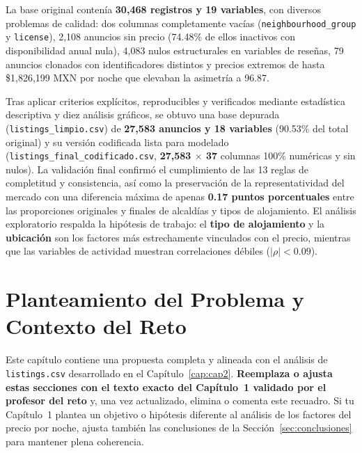 \documentclass[12pt,letterpaper,oneside]{report}
\begin{document}
La base original contenía \textbf{30,468 registros y 19 variables}, con diversos problemas de calidad: dos columnas completamente vacías (\texttt{neighbourhood\_group} y \texttt{license}), 2,108 anuncios sin precio (74.48\% de ellos inactivos con disponibilidad anual nula), 4,083 nulos estructurales en variables de reseñas, 79 anuncios clonados con identificadores distintos y precios extremos de hasta \$1,826,199 MXN por noche que elevaban la asimetría a 96.87.

Tras aplicar criterios explícitos, reproducibles y verificados mediante estadística descriptiva y diez análisis gráficos, se obtuvo una base depurada (\texttt{listings\_limpio.csv}) de \textbf{27,583 anuncios y 18 variables} (90.53\% del total original) y su versión codificada lista para modelado (\texttt{listings\_final\_codificado.csv}, \textbf{27,583 $\times$ 37} columnas 100\% numéricas y sin nulos). La validación final confirmó el cumplimiento de las 13 reglas de completitud y consistencia, así como la preservación de la representatividad del mercado con una diferencia máxima de apenas \textbf{0.17 puntos porcentuales} entre las proporciones originales y finales de alcaldías y tipos de alojamiento. El análisis exploratorio respalda la hipótesis de trabajo: el \textbf{tipo de alojamiento} y la \textbf{ubicación} son los factores más estrechamente vinculados con el precio, mientras que las variables de actividad muestran correlaciones débiles ($|\rho| < 0.09$).

\tableofcontents
\listoffigures
\listoftables

\clearpage
{}

\chapter{Planteamiento del Problema y Contexto del Reto}
\label{cap:cap1}

\begin{tcolorbox}[
  colback=WarnBg,
  colframe=WarnBorder,
  title={\textbf{Nota para el equipo -- Sustituir con el Capítulo 1 validado por el profesor}},
  fonttitle=\bfseries\small,
  arc=2pt,
  boxrule=0.8pt
]
\small
Este capítulo contiene una propuesta completa y alineada con el análisis de \texttt{listings.csv} desarrollado en el Capítulo~\ref{cap:cap2}. \textbf{Reemplaza o ajusta estas secciones con el texto exacto del Capítulo~1 validado por el profesor del reto} y, una vez actualizado, elimina o comenta este recuadro. Si tu Capítulo~1 plantea un objetivo o hipótesis diferente al análisis de los factores del precio por noche, ajusta también las conclusiones de la Sección~\ref{sec:conclusiones} para mantener plena coherencia.
\end{tcolorbox}
\end{document}
